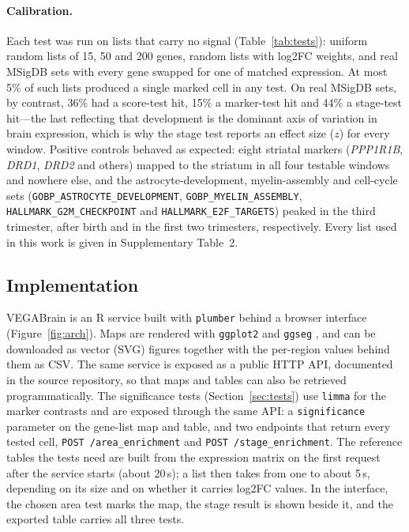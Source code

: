 \documentclass[pdflatex,sn-basic]{sn-jnl}
\begin{document}
\paragraph{Calibration.} Each test was run on lists that carry no signal
(Table~\ref{tab:tests}): uniform random lists of 15, 50 and 200 genes,
random lists with log2FC weights, and real MSigDB sets with every gene swapped
for one of matched expression. At most 5\% of such lists produced a single
marked cell in any test. On real MSigDB sets, by contrast, 36\% had a
score-test hit, 15\% a marker-test hit and 44\% a stage-test hit---the last
reflecting that development is the dominant axis of variation in brain
expression, which is why the stage test reports an effect size ($z$) for every
window. Positive controls behaved as expected: eight striatal markers
(\emph{PPP1R1B}, \emph{DRD1}, \emph{DRD2} and others) mapped to the striatum in
all four testable windows and nowhere else, and the astrocyte-development,
myelin-assembly and cell-cycle sets (\texttt{GOBP\_ASTROCYTE\_DEVELOPMENT},
\texttt{GOBP\_MYELIN\_ASSEMBLY}, \texttt{HALLMARK\_G2M\_CHECKPOINT} and
\texttt{HALLMARK\_E2F\_TARGETS}) peaked in the third trimester, after birth and
in the first two trimesters, respectively. Every list used in this work is given
in Supplementary Table~2.

\subsection{Implementation}\label{sec:impl}

VEGABrain is an R \citep{RCoreTeam2026} service built with \texttt{plumber}
\citep{Schloerke2026plumber} behind a browser interface (Figure~\ref{fig:arch}).
Maps are rendered with \texttt{ggplot2} \citep{Wickham2016} and \texttt{ggseg}
\citep{Mowinckel2020}, and can be downloaded as vector (SVG) figures together
with the per-region values behind them as CSV. The same service is exposed as a
public HTTP API, documented in the source repository, so that maps and tables
can also be retrieved programmatically. The significance tests
(Section~\ref{sec:tests}) use \texttt{limma} \citep{Ritchie2015} for the marker
contrasts and are exposed through the same API: a \texttt{significance}
parameter on the gene-list map and table, and two endpoints that return every
tested cell, \texttt{POST /area\_enrichment} and \texttt{POST
/stage\_enrichment}. The reference tables the tests need are built from the
expression matrix on the first request after the service starts (about 20\,s);
a list then takes from one to about 5\,s, depending on its size and on whether
it carries log2FC values. In the interface, the chosen area test marks the map,
the stage result is shown beside it, and the exported table carries all three
tests.
\end{document}
